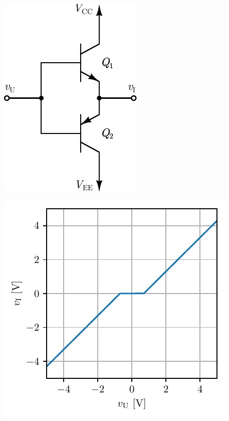 \documentclass[a4paper, 12pt, diplomski]{etf}
\begin{document}
\begin{center}
\begin{minipage}{0.5\textwidth}
\centering
\includegraphics[scale=1]{fig/PAB.pdf}
\label{PAb}
\end{minipage}%
\begin{minipage}{0.5\textwidth}
\centering
\includegraphics[scale=1]{fig_teorija/PAbkka.pdf} 
\label{PAbkka} 
\end{minipage}
\end{center}
\end{document}
